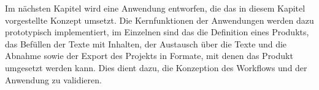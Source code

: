 \begin{samepage}

\secbar

Im nächsten Kapitel wird eine Anwendung entworfen, die das in diesem Kapitel vorgestellte Konzept umsetzt. Die Kernfunktionen der Anwendungen werden dazu prototypisch implementiert, im Einzelnen sind das die Definition eines Produkts, das Befüllen der Texte mit Inhalten, der Austausch über die Texte und die Abnahme sowie der Export des Projekts in Formate, mit denen das Produkt umgesetzt werden kann. Dies dient dazu, die Konzeption des Workflows und der Anwendung zu validieren. 

\end{samepage}

\pagebreak